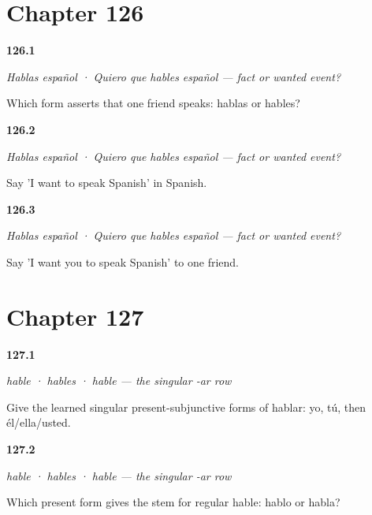 \section*{Chapter 126}

\noindent\begin{minipage}[t]{\linewidth}
\raggedright
\hypertarget{review-ES-C18-quiero-que-meaning}{\textbf{126.1}} \emph{Hablas español · Quiero que hables español — fact or wanted event?}\par
\small Which form asserts that one friend speaks: hablas or hables?
\end{minipage}\par\medskip

\noindent\begin{minipage}[t]{\linewidth}
\raggedright
\hypertarget{review-ES-C18-quiero-que-one-doer}{\textbf{126.2}} \emph{Hablas español · Quiero que hables español — fact or wanted event?}\par
\small Say 'I want to speak Spanish' in Spanish.
\end{minipage}\par\medskip

\noindent\begin{minipage}[t]{\linewidth}
\raggedright
\hypertarget{review-ES-C18-quiero-que-two-doers}{\textbf{126.3}} \emph{Hablas español · Quiero que hables español — fact or wanted event?}\par
\small Say 'I want you to speak Spanish' to one friend.
\end{minipage}\par\medskip

\section*{Chapter 127}

\noindent\begin{minipage}[t]{\linewidth}
\raggedright
\hypertarget{review-ES-C18-subjuntivo-forms}{\textbf{127.1}} \emph{hable · hables · hable — the singular -ar row}\par
\small Give the learned singular present-subjunctive forms of hablar: yo, tú, then él/ella/usted.
\end{minipage}\par\medskip

\noindent\begin{minipage}[t]{\linewidth}
\raggedright
\hypertarget{review-ES-C18-subjuntivo-recipe}{\textbf{127.2}} \emph{hable · hables · hable — the singular -ar row}\par
\small Which present form gives the stem for regular hable: hablo or habla?
\end{minipage}\par\medskip

